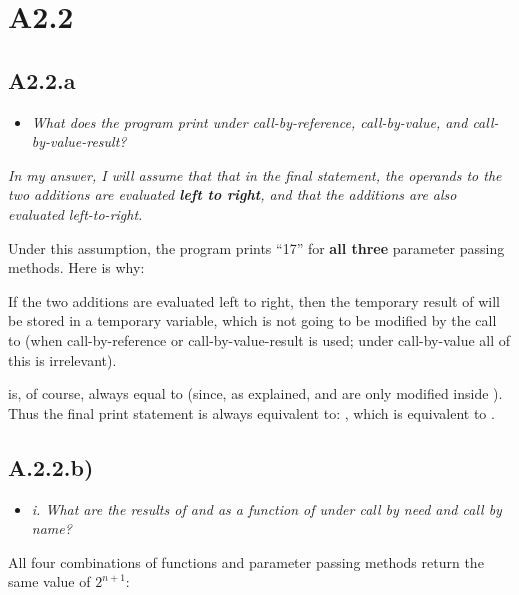 \newpage

\section{A2.2}

\subsection{A2.2.a}

\begin{itemize}
  \item \emph{What does the program print under call-by-reference,
    call-by-value, and call-by-value-result?}
\end{itemize}

\emph{In my answer, I will assume that that in the final  statement, the
operands to the two additions are evaluated \textbf{left to right}, and that the
additions are also evaluated left-to-right.}

\smallskip

Under this assumption, the program prints ``17'' for \textbf{all three}
parameter passing methods. Here is why:

\medskip

If the two additions are evaluated left to right, then the temporary result of
 will be stored in a temporary variable, which is not going to be
modified by the call to  (when call-by-reference or call-by-value-result
is used; under call-by-value all of this is irrelevant). \smallskip

 is, of course, always equal to  (since, as
explained,  and  are only modified inside ). Thus the final
print statement is always equivalent to: , which
is equivalent to .

\sectend

\subsection{A.2.2.b)}


\begin{itemize}
  \item \textit{i. What are the results of  and  as a function
    of  under call by need and call by name?}
\end{itemize}

All four combinations of functions and parameter passing methods return the same
value of $2^{n + 1}$:

